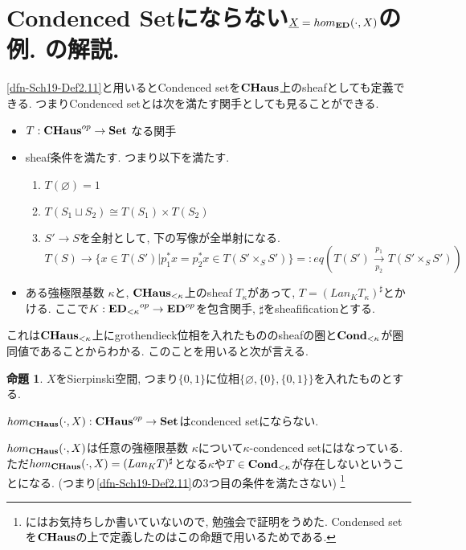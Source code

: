 \documentclass[dvipdfmx,a4paper,11pt]{article}
\theoremstyle{definition}
\newtheorem{prop}[thm]{命題}
\begin{document}
\section{Condenced Setにならない$\underline{X} = hom_{{\bf ED}}(\cdot, X)$の例. \cite[Warning 2.14]{Sch19}の解説.}
\ref{dfn-Sch19-Def2.11}と用いるとCondenced setを${\bf CHaus}$上のsheafとしても定義できる. 
つまりCondenced setとは次を満たす関手としても見ることができる. 
\begin{itemize}
\item $T : {\bf CHaus}^{op} \to {\bf Set}$ なる関手
\item sheaf条件を満たす. 
つまり以下を満たす.
\begin{enumerate}
\item $T(\varnothing)=1$ 
\item $T(S_1\sqcup S_2) \cong T(S_1) \times T(S_2)$
\item $S' \to S$を全射として, 下の写像が全単射になる.
$$T(S) \to \{ x \in T(S') | p_{1}^{*}x = p_{2}^{*}x \in T(S' \times_S S')\}
=:eq(T(S') \underset{p_2}{\overset{p_1}{\to}}T(S' \times_S S'))
$$
\end{enumerate}
\item ある強極限基数 $\kappa$と, ${\bf CHaus}_{< \kappa}$上のsheaf $T_{\kappa}$があって, $T = (Lan_{K}T_{\kappa})^{\sharp}$とかける. ここで$K : {{\bf ED}_{<\kappa}}^{op} \to {\bf ED}^{op}$を包含関手, $\sharp$をsheafificationとする. 
\end{itemize}

これは${ \bf CHaus}_{< \kappa}$上にgrothendieck位相を入れたもののsheafの圏と${\bf  Cond}_{< \kappa}$が圏同値であることからわかる. 
このことを用いると次が言える. 

\begin{tcolorbox}
 [colback = white, colframe = green!35!black, fonttitle = \bfseries,breakable = true]
\begin{prop}\cite[Warning 2.14]{Sch19}
$X$をSierpinski空間, つまり$\{0,1\}$に位相$\{\varnothing, \{0\}, \{0,1\} \}$を入れたものとする.

$hom_{{\bf CHaus}}(\cdot,  X) :{\bf CHaus}^{op} \to{\bf Set} $はcondenced setにならない.
\end{prop}
 \end{tcolorbox}
 
 $hom_{{\bf CHaus}}(\cdot,  X)$は任意の強極限基数
 $\kappa$について$\kappa$-condenced setにはなっている. 
 ただ$hom_{{\bf CHaus}}(\cdot,  X) =  (Lan_{K}T)^{\sharp}$となる$\kappa$や$T \in {\bf Cond}_{< \kappa}$が存在しないということになる. (つまり\ref{dfn-Sch19-Def2.11}の3つ目の条件を満たさない)
 \footnote{\cite[Warning 2.14]{Sch19}にはお気持ちしか書いていないので, 勉強会で証明をうめた. Condensed setを${\bf CHaus}$の上で定義したのはこの命題で用いるためである.}
 
\end{document}
